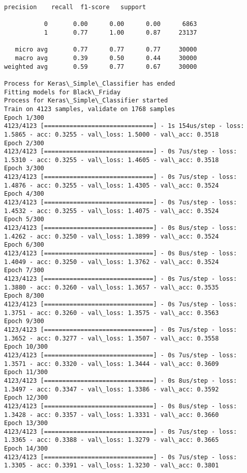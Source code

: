 \documentclass[11pt]{article}
\begin{document}
    \begin{Verbatim}[commandchars=\\\{\}]
              precision    recall  f1-score   support

           0       0.00      0.00      0.00      6863
           1       0.77      1.00      0.87     23137

   micro avg       0.77      0.77      0.77     30000
   macro avg       0.39      0.50      0.44     30000
weighted avg       0.59      0.77      0.67     30000

Process for Keras\_Simple\_Classifier has ended
Fitting models for Black\_Friday
Process for Keras\_Simple\_Classifier started
Train on 4123 samples, validate on 1768 samples
Epoch 1/300
4123/4123 [==============================] - 1s 154us/step - loss: 1.5865 - acc: 0.3255 - val\_loss: 1.5000 - val\_acc: 0.3518
Epoch 2/300
4123/4123 [==============================] - 0s 7us/step - loss: 1.5310 - acc: 0.3255 - val\_loss: 1.4605 - val\_acc: 0.3518
Epoch 3/300
4123/4123 [==============================] - 0s 7us/step - loss: 1.4876 - acc: 0.3255 - val\_loss: 1.4305 - val\_acc: 0.3524
Epoch 4/300
4123/4123 [==============================] - 0s 7us/step - loss: 1.4532 - acc: 0.3255 - val\_loss: 1.4075 - val\_acc: 0.3524
Epoch 5/300
4123/4123 [==============================] - 0s 8us/step - loss: 1.4262 - acc: 0.3250 - val\_loss: 1.3899 - val\_acc: 0.3524
Epoch 6/300
4123/4123 [==============================] - 0s 8us/step - loss: 1.4049 - acc: 0.3250 - val\_loss: 1.3762 - val\_acc: 0.3524
Epoch 7/300
4123/4123 [==============================] - 0s 7us/step - loss: 1.3880 - acc: 0.3260 - val\_loss: 1.3657 - val\_acc: 0.3535
Epoch 8/300
4123/4123 [==============================] - 0s 7us/step - loss: 1.3751 - acc: 0.3260 - val\_loss: 1.3575 - val\_acc: 0.3563
Epoch 9/300
4123/4123 [==============================] - 0s 7us/step - loss: 1.3652 - acc: 0.3277 - val\_loss: 1.3507 - val\_acc: 0.3558
Epoch 10/300
4123/4123 [==============================] - 0s 7us/step - loss: 1.3571 - acc: 0.3320 - val\_loss: 1.3444 - val\_acc: 0.3609
Epoch 11/300
4123/4123 [==============================] - 0s 8us/step - loss: 1.3497 - acc: 0.3347 - val\_loss: 1.3386 - val\_acc: 0.3592
Epoch 12/300
4123/4123 [==============================] - 0s 8us/step - loss: 1.3428 - acc: 0.3357 - val\_loss: 1.3331 - val\_acc: 0.3660
Epoch 13/300
4123/4123 [==============================] - 0s 7us/step - loss: 1.3365 - acc: 0.3388 - val\_loss: 1.3279 - val\_acc: 0.3665
Epoch 14/300
4123/4123 [==============================] - 0s 7us/step - loss: 1.3305 - acc: 0.3391 - val\_loss: 1.3230 - val\_acc: 0.3801

\end{Verbatim}
\end{document}
